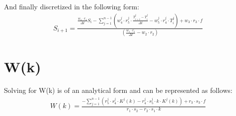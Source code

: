\documentclass{article}
\def\ds{\displaystyle}
\begin{document}
And finally discretized in the following form:
\begin{align}
S_{i+1} =  \frac{\frac{w_1 \cdot r_1}{\Delta t}S_i - \ds\sum_{j=1}^{n-1} \left( w_4^j \cdot r_5^j \cdot \frac{T^j_{i+1} - T^j_i}{\Delta t} - w_5^j \cdot r_4^j \cdot T^j_i \right) + w_3 \cdot r_3 \cdot f}{\left( \frac{w_1 \cdot r_1}{\Delta t} - w_2 \cdot r_2 \right)}
\end{align}

\section*{W(k)}
Solving for W(k) is of an analytical form and can be represented as follows:  
\begin{align}
W(k) = \frac{ -\ds\sum_{j=1}^{n-1} \left( r_5^j \cdot s_4^j \cdot K^j(k) - r_4^j \cdot s_5^j \cdot k \cdot K^j(k) \right) + r_3 \cdot s_3 \cdot f }{r_1 \cdot s_2 - r_2 \cdot s_1 \cdot k}
\end{align}

\newpage
\end{document}
